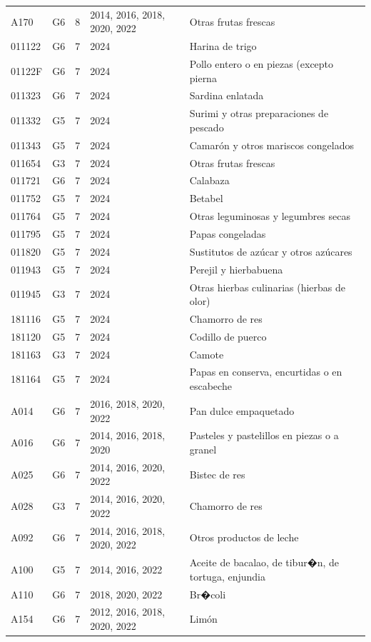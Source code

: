 \begin{table}[ht]
\begin{tabular}{llrll}
  A170 & G6 &   8 & 2014, 2016, 2018, 2020, 2022 & Otras frutas frescas \\ 
  011122 & G6 &   7 & 2024 & Harina de trigo \\ 
  01122F & G6 &   7 & 2024 & Pollo entero o en piezas (excepto pierna \\ 
  011323 & G6 &   7 & 2024 & Sardina enlatada \\ 
  011332 & G5 &   7 & 2024 & Surimi y otras preparaciones de pescado \\ 
  011343 & G5 &   7 & 2024 & Camarón y otros mariscos congelados \\ 
  011654 & G3 &   7 & 2024 & Otras frutas frescas \\ 
  011721 & G6 &   7 & 2024 & Calabaza \\ 
  011752 & G5 &   7 & 2024 & Betabel \\ 
  011764 & G5 &   7 & 2024 & Otras leguminosas y legumbres secas \\ 
  011795 & G5 &   7 & 2024 & Papas congeladas \\ 
  011820 & G5 &   7 & 2024 & Sustitutos de azúcar y otros azúcares \\ 
  011943 & G5 &   7 & 2024 & Perejil y hierbabuena \\ 
  011945 & G3 &   7 & 2024 & Otras hierbas culinarias (hierbas de olor) \\ 
  181116 & G5 &   7 & 2024 & Chamorro de res \\ 
  181120 & G5 &   7 & 2024 & Codillo de puerco \\ 
  181163 & G3 &   7 & 2024 & Camote \\ 
  181164 & G5 &   7 & 2024 & Papas en conserva, encurtidas o en escabeche \\ 
  A014 & G6 &   7 & 2016, 2018, 2020, 2022 & Pan dulce empaquetado \\ 
  A016 & G6 &   7 & 2014, 2016, 2018, 2020 & Pasteles y pastelillos en piezas o a granel \\ 
  A025 & G6 &   7 & 2014, 2016, 2020, 2022 & Bistec de res \\ 
  A028 & G3 &   7 & 2014, 2016, 2020, 2022 & Chamorro de res \\ 
  A092 & G6 &   7 & 2014, 2016, 2018, 2020, 2022 & Otros productos de leche \\ 
  A100 & G5 &   7 & 2014, 2016, 2022 & Aceite de bacalao, de tibur�n, de tortuga, enjundia \\ 
  A110 & G6 &   7 & 2018, 2020, 2022 & Br�coli \\ 
  A154 & G6 &   7 & 2012, 2016, 2018, 2020, 2022 & Limón \\ 

\end{tabular}
\end{table}
